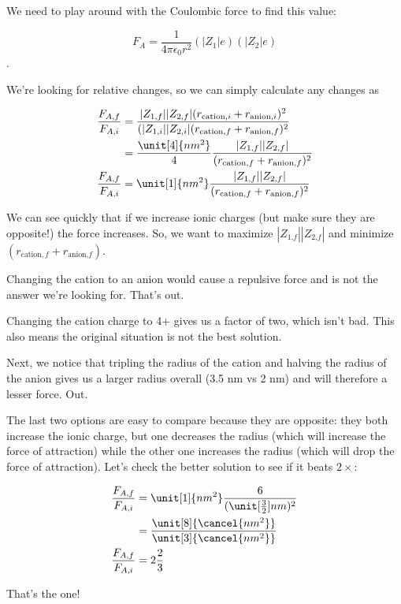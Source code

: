 \begin{solution}

We need to play around with the Coulombic force to find this value: 

\[F_{A} = \frac{1}{4\pi \epsilon_{0}r^{2}}(|Z_{1}|e)(|Z_{2}|e)\]. 

We're looking for relative changes, so we can simply calculate any changes as 

\begin{align*}
\frac{F_{A\text{,}f}}{F_{A\text{,}i}} &= \frac{|Z_{1\text{,}f}||Z_{2\text{,}f}|(r_{\text{cation},i}+r_{\text{anion,}i})^2}{(|Z_{1\text{,}i}||Z_{2\text{,}i}|(r_{\text{cation},f}+r_{\text{anion,}f})^{2}}\\
&= \frac{\unit[4]{nm^2}}{4}\frac{|Z_{1\text{,}f}||Z_{2\text{,}f}|}{(r_{\text{cation},f}+r_{\text{anion,}f})^2}\\
\frac{F_{A\text{,}f}}{F_{A\text{,}i}} &= \unit[1]{nm^2}\frac{|Z_{1\text{,}f}||Z_{2\text{,}f}|}{(r_{\text{cation},f}+r_{\text{anion,}f})^2}
\end{align*}

We can see quickly that if we increase ionic charges (but make sure they are opposite!) the force increases. So, we want to maximize $|Z_{1\text{,}f}||Z_{2\text{,}f}|$ and minimize $(r_{\text{cation},f}+r_{\text{anion,}f})$.

Changing the cation to an anion would cause a repulsive force and is not the answer we're looking for. That's out.

Changing the cation charge to 4+ gives us a factor of two, which isn't bad. This also means the original situation is not the best solution. 

Next, we notice that tripling the radius of the cation and halving the radius of the anion gives us a larger radius overall (3.5 nm vs 2 nm) and will therefore a lesser force. Out.

The last two options are easy to compare because they are opposite: they both increase the ionic charge, but one decreases the radius (which will increase the force of attraction) while the other one increases the radius (which will drop the force of attraction). Let's check the better solution to see if it beats $2\times$:

\begin{align*}
\frac{F_{A\text{,}f}}{F_{A\text{,}i}} &= \unit[1]{nm^{2}}\frac{6}{(\unit[\frac{3}{2}]{nm})^2}\\
&= \frac{\unit[8]{\cancel{nm^2}}}{\unit[3]{\cancel{nm^2}}}\\
\frac{F_{A\text{,}f}}{F_{A\text{,}i}} &= 2\frac{2}{3}
\end{align*}

That's the one! 

\end{solution}

